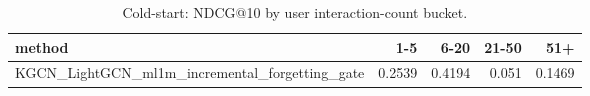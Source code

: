 \begin{table}[t]
\centering
\caption{Cold-start: NDCG@10 by user interaction-count bucket.}
\label{tab:coldstart_ndcg10}
\begin{tabular}{lrrrr}
\toprule
method & 1-5 & 6-20 & 21-50 & 51+ \\
\midrule
KGCN\_LightGCN\_ml1m\_incremental\_forgetting\_gate & 0.2539 & 0.4194 & 0.051 & 0.1469 \\
\bottomrule
\end{tabular}
\end{table}
